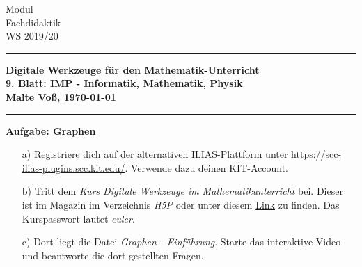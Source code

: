 \documentclass[a4paper,11pt]{scrreprt} %
\theoremstyle{definition} %
\begin{document}
%
\hfill \parbox{22mm}
{ 
Modul \\ Fachdidaktik \\ WS 2019/20 
}

\rule{\textwidth}{1pt}                                   %
%
\begin{center}
\textbf{
Digitale Werkzeuge für den Mathematik-Unterricht \\[1ex] %
%
{
\Large 9. Blatt:  \glqq IMP - Informatik, Mathematik, Physik\grqq } \\[1ex]
%
%
Malte Vo\ss, \today
}
\end{center}
% 
\rule{\textwidth}{1pt}                                 %
\vspace*{.5cm} 
 
\textbf{Aufgabe: Graphen}
\begin{enumerate}
    \item[a)] 
        Registriere dich auf der alternativen ILIAS-Plattform unter
        \url{https://scc-ilias-plugins.scc.kit.edu/}. 
        Verwende dazu deinen KIT-Account.

    \item[b)]
        Tritt dem \emph{Kurs Digitale Werkzeuge im Mathematikunterricht} bei.
        Dieser ist im Magazin im Verzeichnis \emph{H5P} oder unter diesem 
        \href{https://scc-ilias-plugins.scc.kit.edu/goto.php?target=crs_5451&client_id=pilot}{Link}
        zu finden.
        Das Kurspasswort lautet \emph{euler}.

    \item[c)]
        Dort liegt die Datei \emph{Graphen - Einführung}. 
        Starte das interaktive Video und beantworte die dort gestellten Fragen.
\end{enumerate}
%

\vspace{3ex}
\end{document}
